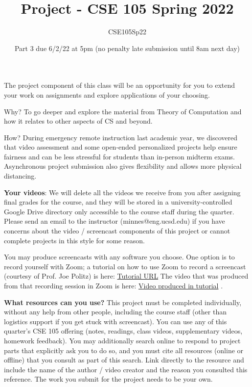 \documentclass[12pt, oneside]{article}
\author{CSE105Sp22}
\title{Project - CSE 105 Spring 2022}
\date{Part 3 due 6/2/22 at 5pm (no penalty late submission until 8am next day)}
\begin{document}
\maketitle
\thispagestyle{fancy}

\vspace{-30pt}

 The project component of this class will be an opportunity for you to extend your work on 
 assignments and explore applications of your choosing. 
 
 Why?  To go deeper and explore the material from Theory of Computation and how it relates to 
 other aspects of CS and beyond. 
 
 How?  During emergency remote instruction last academic year, we discovered that video 
 assessment and some open-ended personalized projects help ensure fairness and can be less 
 stressful for students than in-person midterm exams. Asynchronous project submission also 
 gives flexibility and allows more physical distancing. 
 
 {\bf Your videos}: We will delete all the videos we receive from you after assigning final grades for 
 the course, and they will be stored in a university-controlled Google Drive directory only 
 accessible to the course staff during the quarter. Please send an email to the instructor 
 (minnes@eng.ucsd.edu) if you have concerns about the video / screencast components of this 
 project or cannot complete projects in this style for some reason. 
 
 You may produce screencasts with any software you choose. One option is to record yourself 
 with Zoom; a tutorial on how to use Zoom to record a screencast (courtesy of Prof. Joe Politz) is 
 here: \href{https://drive.google.com/open?id=1KROMAQuTCk40zwrEFotlYSJJQdcG_GUU}{Tutorial URL}
 The video that was produced from that recording session in Zoom is here:
 \href{{https://drive.google.com/open?id=1MxJN6CQcXqIbOekDYMxjh7mTt1TyRVMl}}{Video produced in tutorial} .
 
 {\bf What resources can you use? }
 This project must be completed individually, without any help from other people, 
 including the course staff (other than logistics support if you get stuck with screencast). 
 You can use any of this quarter’s CSE 105 offering (notes, readings, class videos, 
 supplementary videos, homework feedback). You may additionally search online to respond to 
 project parts that explicitly ask you to do so, and you must  cite all resources (online or offline) 
 that you consult as part of this search. Link directly to the resource and include the name of the 
 author / video creator and the reason you consulted this reference. The work you submit for the 
 project needs to be your own. 
 
\end{document}
